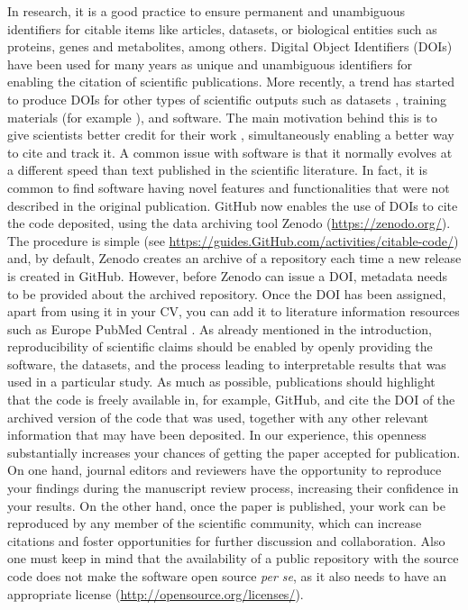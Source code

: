 \documentclass[10pt,letterpaper]{article}
\begin{document}
In research, it is a good practice to ensure permanent and unambiguous
identifiers for citable items like articles, datasets, or biological
entities such as proteins, genes and metabolites, among others. Digital
Object Identifiers (DOIs) have been used for many years as unique and
unambiguous identifiers for enabling the citation of scientific
publications. More recently, a trend has started to produce DOIs for
other types of scientific outputs such as datasets \cite{Vizcaino:2014},
training materials (for example \cite{Ahmadia_2015_27353}), and software. The main
motivation behind this is to give scientists better credit for their
work \cite{NatBiotechEditorial:2009,force11-scwg}, simultaneously enabling a better
way to cite and track it. A common issue with software is that it
normally evolves at a different speed than text published in the
scientific literature. In fact, it is common to find software having
novel features and functionalities that were not described in the
original publication. GitHub now enables the use of DOIs to cite the
code deposited, using the data archiving tool Zenodo
(\url{https://zenodo.org/}). The procedure is simple (see
\url{https://guides.GitHub.com/activities/citable-code/}) and, by default,
Zenodo creates an archive of a repository each time a new release is
created in GitHub. However, before Zenodo can issue a DOI, metadata
needs to be provided about the archived repository. Once the DOI has
been assigned, apart from using it in your CV, you can add it to
literature information resources such as Europe PubMed Central
\cite{EuropePMCConsortium:2015}. As already mentioned in the
introduction, reproducibility of scientific claims should be enabled by
openly providing the software, the datasets, and the process leading to
interpretable results that was used in a particular study. As much as possible,
publications should highlight that the code is
freely available in, for example, GitHub, and cite the DOI of the archived version
of the code that was used, together with any other
relevant information that may have been deposited. In our
experience, this openness substantially increases your chances of
getting the paper accepted for publication. On one hand, journal editors
and reviewers have the opportunity to reproduce your findings during the
manuscript review process, increasing their confidence in your results. On
the other hand, once the paper is published, your work can be reproduced
by any member of the scientific community, which can increase citations
and foster opportunities for further discussion and collaboration. Also
one must keep in mind that the availability of a public repository with
the source code does not make the software open source \emph{per se}, as
it also needs to have an appropriate license
(\url{http://opensource.org/licenses/}).
\end{document}
